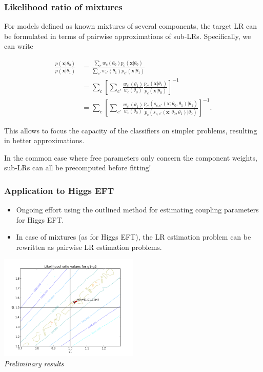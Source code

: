 \documentclass{beamer}
\begin{document}
\begin{frame}
    \frametitle{Likelihood ratio of mixtures}

    For models defined as known mixtures of several components,
    the target LR can be formulated in terms of pairwise
    approximations of sub-LRs. Specifically, we can write

    {\scriptsize
    \begin{align*}
    \frac{p(\mathbf{x}|\theta_0)}{p(\mathbf{x}|\theta_1)} &= \frac{\sum_c w_c(\theta_0) p_c(\mathbf{x}| \theta_0)}{\sum_{c'} w_{c'}(\theta_1) p_{c'}(\mathbf{x}| \theta_1)} \nonumber \\
    &= \sum_c \left[ \sum_{c'} \frac{ w_{c'}(\theta_1)}{w_c(\theta_0)} \frac{ p_{c'}(\mathbf{x}| \theta_1)}{  p_c(\mathbf{x}| \theta_0)}  \right]^{-1} \nonumber \\
    &= \sum_c \left[ \sum_{c'} \frac{ w_{c'}(\theta_1)}{w_c(\theta_0)} \frac{ p_{c'}(s_{c,c'}(\mathbf{x};\theta_0, \theta_1)| \theta_1)}{ p_c(s_{c,c'}(\mathbf{x};\theta_0, \theta_1)| \theta_0)}  \right]^{-1}. \label{eq:decomposedResult}
    \end{align*}}

    This allows to focus the capacity of the classifiers on simpler problems, resulting in better approximations.

    \vspace{1em}

    In the common case where free parameters only concern the component weights, sub-LRs can all be precomputed before fitting!

\end{frame}


\begin{frame}
    \frametitle{Application to Higgs EFT}

    \begin{itemize}
        \item Ongoing effort using the outlined method for estimating coupling parameters for Higgs EFT.
        \item In case of mixtures (as for Higgs EFT), the LR estimation problem can be rewritten as pairwise LR estimation problems.
    \end{itemize}

    \centering
    \includegraphics[width=0.5\textwidth]{figures/eft1.png}\\
    {\it \small Preliminary results}
\end{frame}
\end{document}
